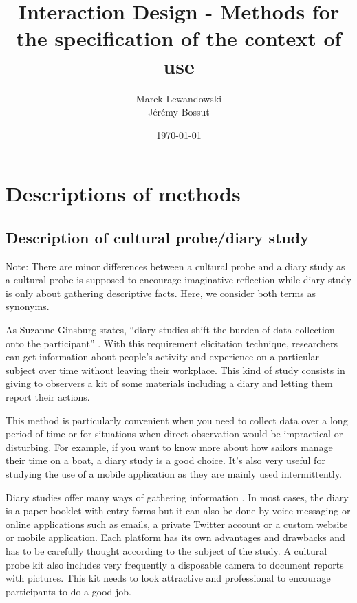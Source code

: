 \documentclass[12pt, a4paper]{article}
\author{Marek Lewandowski \\ Jérémy Bossut}
\date{\today}
\title{Interaction Design - Methods for the specification of the context of use}
\begin{document}
\maketitle
\newpage

\section{Descriptions of methods}

\subsection{Description of cultural probe/diary study}


Note: There are minor differences between a cultural probe and a diary study as a cultural probe is supposed to encourage imaginative reflection while diary study is only about gathering descriptive facts. Here, we consider both terms as synonyms.
 
As Suzanne Ginsburg states, “diary studies shift the burden of data collection onto the participant” \cite{ginsburg_designing_2010}. With this requirement elicitation technique, researchers can get information about people's activity and experience on a particular subject over time without leaving their workplace. This kind of study consists in giving to observers a kit of some materials including a diary and letting them report their actions.

This method is particularly convenient when you need to collect data over a long period of time or for situations when direct observation would be impractical or disturbing. For example, if you want to know more about how sailors manage their time on a boat, a diary study is a good choice. It’s also very useful for studying the use of a mobile application as they are mainly used intermittently.

Diary studies offer many ways of gathering information \cite{webcredible}. In most cases, the diary is a paper booklet with entry forms but it can also be done by voice messaging or online applications such as emails, a private Twitter account or a custom website or mobile application. Each platform has its own advantages and drawbacks and has to be carefully thought according to the subject of the study. A cultural probe kit also includes very frequently a disposable camera to document reports with pictures. This kit needs to look attractive and professional to encourage participants to do a good job.
\end{document}

